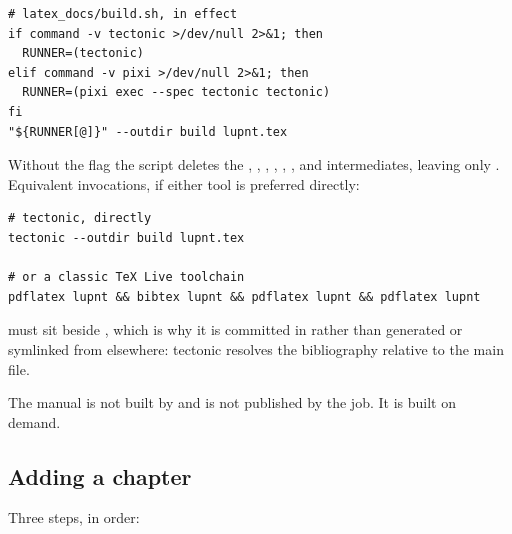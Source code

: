 \begin{lstlisting}[language=shell]
# latex_docs/build.sh, in effect
if command -v tectonic >/dev/null 2>&1; then
  RUNNER=(tectonic)
elif command -v pixi >/dev/null 2>&1; then
  RUNNER=(pixi exec --spec tectonic tectonic)
fi
"${RUNNER[@]}" --outdir build lupnt.tex
\end{lstlisting}

Without the  flag the script deletes the , ,
, , , , and 
intermediates, leaving only . Equivalent invocations, if
either tool is preferred directly:

\begin{lstlisting}[language=shell]
# tectonic, directly
tectonic --outdir build lupnt.tex

# or a classic TeX Live toolchain
pdflatex lupnt && bibtex lupnt && pdflatex lupnt && pdflatex lupnt
\end{lstlisting}

\begin{lupntnote}
 must sit beside , which is why it is committed
in  rather than generated or symlinked from elsewhere:
tectonic resolves the bibliography relative to the main file.
\end{lupntnote}

The manual is not built by  and is not published by
the  job. It is built on demand.

\subsection{Adding a chapter}
\label{sec:bd-newchapter}

Three steps, in order:

